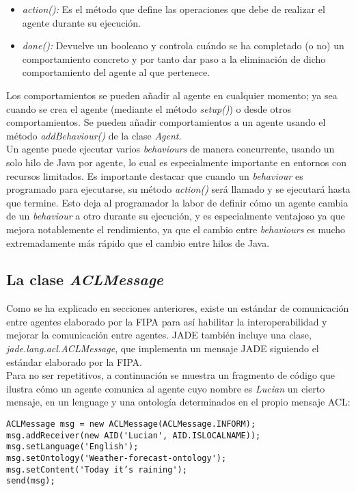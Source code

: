 \begin{itemize}
	\item \textit{action():} Es el método que define las operaciones que debe de realizar el agente durante su ejecución.
	\item \textit{done():} Devuelve un booleano y controla cuándo se ha completado (o no) un comportamiento concreto y por tanto dar paso a la eliminación de dicho comportamiento del agente al que pertenece.
\end{itemize}

Los comportamientos se pueden añadir al agente en cualquier momento; ya sea cuando se crea el agente (mediante el método \textit{setup()}) o desde otros comportamientos. Se pueden añadir comportamientos a un agente usando el método \textit{addBehaviour()} de la clase \textit{Agent}.\\

Un agente puede ejecutar varios \textit{behaviours} de manera concurrente, usando un solo hilo de Java por agente, lo cual es especialmente importante en entornos con recursos limitados. Es importante destacar que cuando un \textit{behaviour} es programado para ejecutarse, su método \textit{action()} será llamado y se ejecutará hasta que termine. Esto deja al programador la labor de definir cómo un agente cambia de un \textit{behaviour} a otro durante su ejecución, y es especialmente ventajoso ya que mejora notablemente el rendimiento, ya que el cambio entre \textit{behaviours} es mucho extremadamente más rápido que el cambio entre hilos de Java.

\subsection{La clase \textit{ACLMessage}}

Como se ha explicado en secciones anteriores, existe un estándar de comunicación entre agentes elaborado por la FIPA para así habilitar la interoperabilidad y mejorar la comunicación entre agentes. JADE también incluye una clase, \textit{jade.lang.acl.ACLMessage}, que implementa un mensaje JADE siguiendo el estándar elaborado por la FIPA.\\

Para no ser repetitivos, a continuación se muestra un fragmento de código que ilustra cómo un agente comunica al agente cuyo nombre es \textit{Lucian} un cierto mensaje, en un lenguage y una ontología determinados en el propio mensaje ACL:

\begin{lstlisting}
ACLMessage msg = new ACLMessage(ACLMessage.INFORM);
msg.addReceiver(new AID('Lucian', AID.ISLOCALNAME));
msg.setLanguage('English');
msg.setOntology('Weather-forecast-ontology');
msg.setContent('Today it’s raining');
send(msg);
\end{lstlisting}

